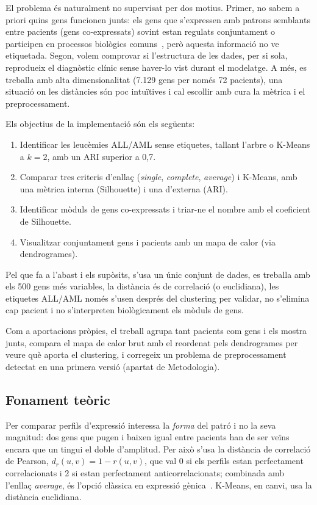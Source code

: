 \documentclass[a4paper,11pt]{article}
\begin{document}
El problema és naturalment no supervisat per dos motius. Primer, no sabem a priori quins gens funcionen junts: els gens que s'expressen amb patrons semblants entre pacients (gens co-expressats) sovint estan regulats conjuntament o participen en processos biològics comuns~\cite{eisen}, però aquesta informació no ve etiquetada. Segon, volem comprovar si l'estructura de les dades, per si sola, reprodueix el diagnòstic clínic sense haver-lo vist durant el modelatge. A més, es treballa amb alta dimensionalitat (7.129 gens per només 72 pacients), una situació on les distàncies són poc intuïtives i cal escollir amb cura la mètrica i el preprocessament.

Els objectius de la implementació són els següents:
\begin{enumerate}
  \item Identificar les leucèmies ALL/AML sense etiquetes, tallant l'arbre o K-Means a $k=2$, amb un ARI superior a 0,7.
  \item Comparar tres criteris d'enllaç (\emph{single}, \emph{complete}, \emph{average}) i K-Means, amb una mètrica interna (Silhouette) i una d'externa (ARI).
  \item Identificar mòduls de gens co-expressats i triar-ne el nombre amb el coeficient de Silhouette.
  \item Visualitzar conjuntament gens i pacients amb un mapa de calor (via dendrogrames).
\end{enumerate}
Pel que fa a l'abast i els supòsits, s'usa un únic conjunt de dades, es treballa amb els 500 gens més variables, la distància és de correlació (o euclidiana), les etiquetes ALL/AML només s'usen després del clustering per validar, no s'elimina cap pacient i no s'interpreten biològicament els mòduls de gens.

Com a aportacions pròpies, el treball agrupa tant pacients com gens i els mostra junts, compara el mapa de calor brut amb el reordenat pels dendrogrames per veure què aporta el clustering, i corregeix un problema de preprocessament detectat en una primera versió (apartat de Metodologia).

\subsection{Fonament teòric}

Per comparar perfils d'expressió interessa la \emph{forma} del patró i no la seva magnitud: dos gens que pugen i baixen igual entre pacients han de ser veïns encara que un tingui el doble d'amplitud. Per això s'usa la distància de correlació de Pearson, $d_r(u,v)=1-r(u,v)$, que val 0 si els perfils estan perfectament correlacionats i 2 si estan perfectament anticorrelacionats; combinada amb l'enllaç \emph{average}, és l'opció clàssica en expressió gènica~\cite{eisen}. K-Means, en canvi, usa la distància euclidiana.
\end{document}
